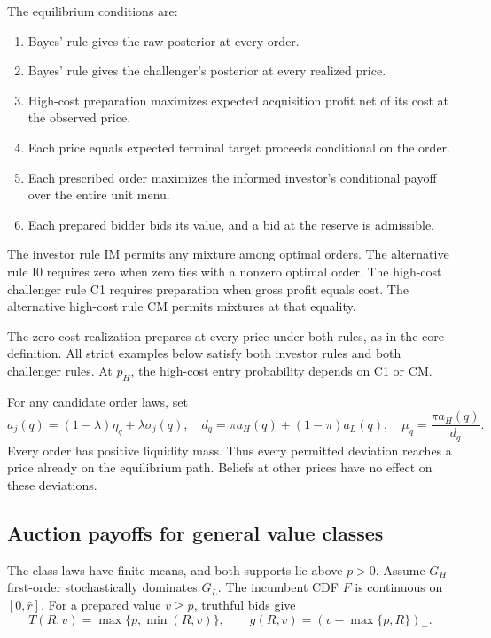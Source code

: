 \documentclass[12pt]{article}
\begin{document}
The equilibrium conditions are:
\begin{enumerate}
\item Bayes' rule gives the raw posterior at every order.
\item Bayes' rule gives the challenger's posterior at every realized price.
\item High-cost preparation maximizes expected acquisition profit net of its cost at the observed price.
\item Each price equals expected terminal target proceeds conditional on the order.
\item Each prescribed order maximizes the informed investor's conditional payoff over the entire unit menu.
\item Each prepared bidder bids its value, and a bid at the reserve is admissible.
\end{enumerate}

The investor rule IM permits any mixture among optimal orders.
The alternative rule I0 requires zero when zero ties with a nonzero optimal order.
The high-cost challenger rule C1 requires preparation when gross profit equals cost.
The alternative high-cost rule CM permits mixtures at that equality.

The zero-cost realization prepares at every price under both rules, as in the core definition.
All strict examples below satisfy both investor rules and both challenger rules.
At $p_H$, the high-cost entry probability depends on C1 or CM.

For any candidate order laws, set
\begin{equation}\label{eq:bayes}
 a_j(q)=(1-\lambda)\eta_q+\lambda\sigma_j(q),\quad
 d_q=\pi a_H(q)+(1-\pi)a_L(q),\quad
 \mu_q=\frac{\pi a_H(q)}{d_q}.
\end{equation}
Every order has positive liquidity mass.
Thus every permitted deviation reaches a price already on the equilibrium path.
Beliefs at other prices have no effect on these deviations.

\subsection{Auction payoffs for general value classes}
The class laws have finite means, and both supports lie above $p>0$.
Assume $G_H$ first-order stochastically dominates $G_L$.
The incumbent CDF $F$ is continuous on $[0,\bar r]$.
For a prepared value $v\ge p$, truthful bids give
\begin{equation}\label{eq:kernels}
 T(R,v)=\max\{p,\min(R,v)\},\qquad g(R,v)=(v-\max\{p,R\})_+.
\end{equation}
\end{document}
